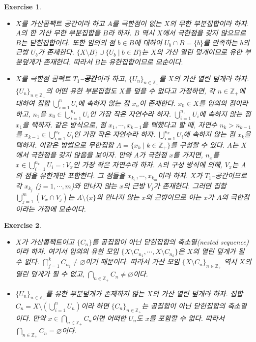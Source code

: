 \documentclass{article}
\newtheorem{exercise}{Exercise}[section]
\newcommand{\Z}{\mathbb{Z}}
\begin{document}
\begin{exercise}
    \phantom{}
    \begin{itemize}
        \item[($\Longrightarrow$)] $X$를 가산콤팩트 공간이라 하고 $A$를 극한점이 없는 $X$의 무한 부분집합이라 하자. $A$의 한 가산 무한 부분집합을 $B$라 하자. $B$ 역시 $X$에서 극한점을 갖지 않으므로 $B$는 닫힌집합이다. 또한 임의의 점 $b\in B$에 대하여 $U_b\cap B=\{b\}$를 만족하는 $b$의 근방 $U_b$가 존재한다. $\{X\setminus B\}\cup \{U_b\mid b\in B\}$는 $X$의 가산 열린 덮개이므로 유한 부분덮개가 존재한다. 따라서 $B$는 유한집합이므로 모순이다.
        \item[($\Longleftarrow$)] $X$를 극한점 콤팩트 \textbf{$T_1$--공간}이라 하고, $\{U_n\}_{n\in\Z_+}$를 $X$의 가산 열린 덮개라 하자. $\{U_n\}_{n\in\Z_+}$의 어떤 유한 부분집합도 $X$를 덮을 수 없다고 가정하면, 각 $n\in\Z_+$에 대하여 집합 $\bigcup_{i=1}^nU_i$에 속하지 않는 점 $x_n$이 존재한다. $x_0\in X$를 임의의 점이라 하고, $n_1$을 $x_0\in\bigcup_{i=1}^{n_1}U_i$인 가장 작은 자연수라 하자. $\bigcup_{i=1}^{n_1}U_i$에 속하지 않는 점 $x_1$을 택하자. 같은 방식으로, 점 $x_1,\cdots,x_{k-1}$을 택했다고 할 때, 자연수 $n_k>n_{k-1}$를 $x_{k-1}\in\bigcup_{i=1}^{n_k}U_i$인 가장 작은 자연수라 하자. $\bigcup_{i=1}^{n_k}U_i$에 속하지 않는 점 $x_k$을 택하자. 이같은 방법으로 무한집합 $A=\{x_k\mid k\in\Z_+\}$를 구성할 수 있다. $A$는 $X$에서 극한점을 갖지 않음을 보이자. 만약 $A$가 극한점 $x$를 가지면, $n_x$를 $x\in\bigcup_{i=1}^{n_x}U_i=:V_x$인 가장 작은 자연수라 하자. $A$의 구성 방식에 의해, $V_x$는 $A$의 점을 유한개만 포함한다. 그 점들을 $x_{k_1},\cdots, x_{k_m}$이라 하자. $X$가 $T_1$--공간이므로 각 $x_{k_j}$ ($j=1,\cdots,m$)와 만나지 않는 $x$의 근방 $V_j$가 존재한다. 그러면 집합 $\bigcup_{j=1}^m(V_x\cap V_j)$는 $A\setminus\{x\}$와 만나지 않는 $x$의 근방이므로 이는 $x$가 $A$의 극한점이라는 가정에 모순이다.
    \end{itemize}
\end{exercise}

\begin{exercise}
    \phantom{}
    \begin{itemize}
        \item[($\Longrightarrow$)] $X$가 가산콤팩트이고 $\{C_n\}$를 공집합이 아닌 닫힌집합의 축소열(nested sequence)이라 하자. 여기서 임의의 유한 모임 $\{X\setminus C_{n_1},\cdots,X\setminus C_{n_k}\}$은 $X$의 열린 덮개가 될 수 없다. $\bigcap_{j=1}^kC_{n_j}\ne\varnothing$이기 때문이다. 따라서 가산 모임 $\{X\setminus C_n\}_{n\in\Z_+}$ 역시 $X$의 열린 덮개가 될 수 없고, $\bigcap_{n\in\Z_+}C_n\ne\varnothing$이다.
        \item[($\Longleftarrow$)] $\{U_n\}_{n\in\Z_+}$를 유한 부분덮개가 존재하지 않는 $X$의 가산 열린 덮개라 하자. 집합 $C_n=X\setminus(\bigcup_{i=1}^nU_n)$이라 하면 $\{C_n\}_{n\in\Z_+}$는 공집합이 아닌 닫힌집합의 축소열이다. 만약 $x\in\bigcap_{n\in\Z_+}C_n$이면 어떠한 $U_n$도 $x$를 포함할 수 없다. 따라서 $\bigcap_{n\in\Z_+}C_n=\varnothing$이다.
    \end{itemize}
\end{exercise}
\end{document}
